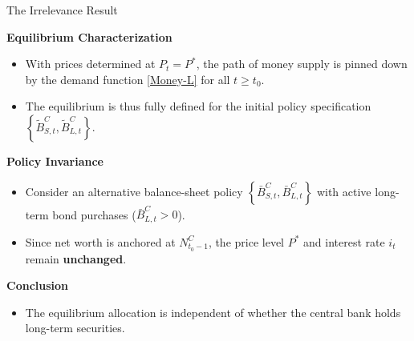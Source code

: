 \documentclass[11pt,aspectratio=169]{beamer}
\begin{document}
\begin{frame}{The Irrelevance Result}
\small

\textbf{Equilibrium Characterization}
\begin{itemize}
    \item With prices determined at $P_{t}=P^{\ast }$, the path of money supply is pinned down by the demand function \eqref{Money-L} for all $t \geq t_{0}$.
    \item The equilibrium is thus fully defined for the initial policy specification $\left\{ \tilde{B}_{S,t}^{C},\tilde{B}_{L,t}^{C}\right\}$.
\end{itemize}

\vspace{0.2cm}

\textbf{Policy Invariance}
\begin{itemize}
    \item Consider an alternative balance-sheet policy $\left\{ \bar{B}_{S,t}^{C},\bar{B}_{L,t}^{C}\right\}$ with active long-term bond purchases ($\bar{B}_{L,t}^{C}>0$).
    \item Since net worth is anchored at $N_{t_{0}-1}^{C}$, the price level $P^*$ and interest rate $i_t$ remain \textbf{unchanged}.
\end{itemize}

\vspace{0.1cm}

\textbf{Conclusion}
\begin{itemize}
    \item The equilibrium allocation is independent of whether the central bank  holds long-term securities.
\end{itemize}
\end{frame}
\end{document}
